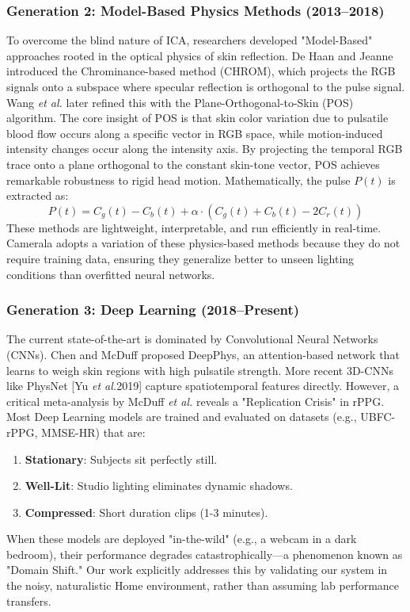 \documentclass[journal]{IEEEtran}
\newcommand{\etal}{\textit{et al.}}
\begin{document}
\subsubsection{Generation 2: Model-Based Physics Methods (2013--2018)}
To overcome the blind nature of ICA, researchers developed "Model-Based" approaches rooted in the optical physics of skin reflection. De Haan and Jeanne \cite{dehaan_chrom} introduced the Chrominance-based method (CHROM), which projects the RGB signals onto a subspace where specular reflection is orthogonal to the pulse signal. Wang \etal \cite{wang_pos} later refined this with the Plane-Orthogonal-to-Skin (POS) algorithm.
The core insight of POS is that skin color variation due to pulsatile blood flow occurs along a specific vector in RGB space, while motion-induced intensity changes occur along the intensity axis. By projecting the temporal RGB trace onto a plane orthogonal to the constant skin-tone vector, POS achieves remarkable robustness to rigid head motion. Mathematically, the pulse $P(t)$ is extracted as:
\begin{equation}
    P(t) = C_g(t) - C_b(t) + \alpha \cdot (C_g(t) + C_b(t) - 2C_r(t))
\end{equation}
These methods are lightweight, interpretable, and run efficiently in real-time. Camerala adopts a variation of these physics-based methods because they do not require training data, ensuring they generalize better to unseen lighting conditions than overfitted neural networks.

\subsubsection{Generation 3: Deep Learning (2018--Present)}
The current state-of-the-art is dominated by Convolutional Neural Networks (CNNs). Chen and McDuff \cite{deepphys} proposed DeepPhys, an attention-based network that learns to weigh skin regions with high pulsatile strength. More recent 3D-CNNs like PhysNet [Yu \etal 2019] capture spatiotemporal features directly.
However, a critical meta-analysis by McDuff \etal \cite{mcduff_rppg} reveals a "Replication Crisis" in rPPG. Most Deep Learning models are trained and evaluated on datasets (e.g., UBFC-rPPG, MMSE-HR) that are:
\begin{enumerate}
    \item \textbf{Stationary}: Subjects sit perfectly still.
    \item \textbf{Well-Lit}: Studio lighting eliminates dynamic shadows.
    \item \textbf{Compressed}: Short duration clips (1-3 minutes).
\end{enumerate}
When these models are deployed "in-the-wild" (e.g., a webcam in a dark bedroom), their performance degrades catastrophically—a phenomenon known as "Domain Shift." Our work explicitly addresses this by validating our system in the noisy, naturalistic Home environment, rather than assuming lab performance transfers.
\end{document}
